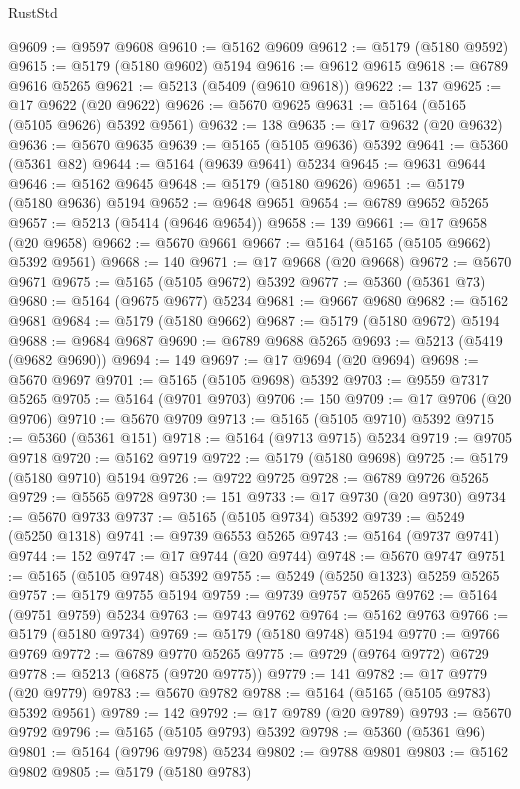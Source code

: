 \begin{lexlean}{RustStd}
\begin{coremodule}
@9609 := @9597 @9608
@9610 := @5162 @9609
@9612 := @5179 (@5180 @9592)
@9615 := @5179 (@5180 @9602) @5194
@9616 := @9612 @9615
@9618 := @6789 @9616 @5265
@9621 := @5213 (@5409 (@9610 @9618))
@9622 := 137
@9625 := @17 @9622 (@20 @9622)
@9626 := @5670 @9625
@9631 := @5164 (@5165 (@5105 @9626) @5392 @9561)
@9632 := 138
@9635 := @17 @9632 (@20 @9632)
@9636 := @5670 @9635
@9639 := @5165 (@5105 @9636) @5392
@9641 := @5360 (@5361 @82)
@9644 := @5164 (@9639 @9641) @5234
@9645 := @9631 @9644
@9646 := @5162 @9645
@9648 := @5179 (@5180 @9626)
@9651 := @5179 (@5180 @9636) @5194
@9652 := @9648 @9651
@9654 := @6789 @9652 @5265
@9657 := @5213 (@5414 (@9646 @9654))
@9658 := 139
@9661 := @17 @9658 (@20 @9658)
@9662 := @5670 @9661
@9667 := @5164 (@5165 (@5105 @9662) @5392 @9561)
@9668 := 140
@9671 := @17 @9668 (@20 @9668)
@9672 := @5670 @9671
@9675 := @5165 (@5105 @9672) @5392
@9677 := @5360 (@5361 @73)
@9680 := @5164 (@9675 @9677) @5234
@9681 := @9667 @9680
@9682 := @5162 @9681
@9684 := @5179 (@5180 @9662)
@9687 := @5179 (@5180 @9672) @5194
@9688 := @9684 @9687
@9690 := @6789 @9688 @5265
@9693 := @5213 (@5419 (@9682 @9690))
@9694 := 149
@9697 := @17 @9694 (@20 @9694)
@9698 := @5670 @9697
@9701 := @5165 (@5105 @9698) @5392
@9703 := @9559 @7317 @5265
@9705 := @5164 (@9701 @9703)
@9706 := 150
@9709 := @17 @9706 (@20 @9706)
@9710 := @5670 @9709
@9713 := @5165 (@5105 @9710) @5392
@9715 := @5360 (@5361 @151)
@9718 := @5164 (@9713 @9715) @5234
@9719 := @9705 @9718
@9720 := @5162 @9719
@9722 := @5179 (@5180 @9698)
@9725 := @5179 (@5180 @9710) @5194
@9726 := @9722 @9725
@9728 := @6789 @9726 @5265
@9729 := @5565 @9728
@9730 := 151
@9733 := @17 @9730 (@20 @9730)
@9734 := @5670 @9733
@9737 := @5165 (@5105 @9734) @5392
@9739 := @5249 (@5250 @1318)
@9741 := @9739 @6553 @5265
@9743 := @5164 (@9737 @9741)
@9744 := 152
@9747 := @17 @9744 (@20 @9744)
@9748 := @5670 @9747
@9751 := @5165 (@5105 @9748) @5392
@9755 := @5249 (@5250 @1323) @5259 @5265
@9757 := @5179 @9755 @5194
@9759 := @9739 @9757 @5265
@9762 := @5164 (@9751 @9759) @5234
@9763 := @9743 @9762
@9764 := @5162 @9763
@9766 := @5179 (@5180 @9734)
@9769 := @5179 (@5180 @9748) @5194
@9770 := @9766 @9769
@9772 := @6789 @9770 @5265
@9775 := @9729 (@9764 @9772) @6729
@9778 := @5213 (@6875 (@9720 @9775))
@9779 := 141
@9782 := @17 @9779 (@20 @9779)
@9783 := @5670 @9782
@9788 := @5164 (@5165 (@5105 @9783) @5392 @9561)
@9789 := 142
@9792 := @17 @9789 (@20 @9789)
@9793 := @5670 @9792
@9796 := @5165 (@5105 @9793) @5392
@9798 := @5360 (@5361 @96)
@9801 := @5164 (@9796 @9798) @5234
@9802 := @9788 @9801
@9803 := @5162 @9802
@9805 := @5179 (@5180 @9783)

\end{coremodule}
\end{lexlean}
